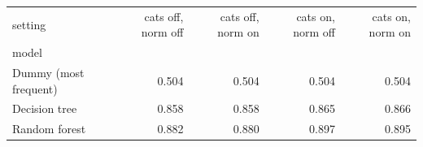 \begin{tabular}{lrrrr}
\toprule
setting & cats off, norm off & cats off, norm on & cats on, norm off & cats on, norm on \\
model &  &  &  &  \\
\midrule
Dummy (most frequent) & 0.504 & 0.504 & 0.504 & 0.504 \\
Decision tree & 0.858 & 0.858 & 0.865 & 0.866 \\
Random forest & 0.882 & 0.880 & 0.897 & 0.895 \\
\bottomrule
\end{tabular}
